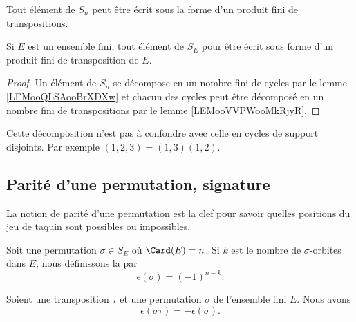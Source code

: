 \begin{proposition} \label{PropPWIJbu}
	Tout élément de \( S_n\) peut être écrit sous la forme d'un produit fini de transpositions.

	Si \( E \) est un ensemble fini, tout élément de \( S_E\) pour être écrit sous forme d'un produit fini de transposition de \( E\).
\end{proposition}

\begin{proof}
	Un élément de \( S_n\) se décompose en un nombre fini de cycles par le lemme \ref{LEMooQLSAooBrXDXw} et chacun des cycles peut être décomposé en un nombre fini de transpositions par le lemme \ref{LEMooVVPWooMkRjyR}.
\end{proof}

Cette décomposition n'est pas à confondre avec celle en cycles de support disjoints. Par exemple \( (1,2,3)=(1,3)(1,2)\).

\subsection{Parité d'une permutation, signature}

La notion de parité d'une permutation est la clef pour savoir quelles positions du jeu de taquin sont possibles ou impossibles\cite{BIBooGLIWooAggcqh,BIBooCDDXooYWCtNZ}.

\begin{definition}	\label{DEFooYDUHooKIXGNW}
	Soit une permutation \( \sigma\in S_E\) où \( \Card(E)=n\). Si \( k\) est le nombre de \( \sigma\)-orbites dans \( E\), nous définissons la  par
	\begin{equation}
		\epsilon(\sigma)=(-1)^{n-k}.
	\end{equation}
\end{definition}

\begin{proposition}	\label{PROPooWCHBooTgMokj}
	Soient une transposition \( \tau\) et une permutation \( \sigma\) de l'ensemble fini \( E\). Nous avons
	\begin{equation}
		\epsilon(\sigma\tau)=-\epsilon(\sigma).
	\end{equation}
\end{proposition}

